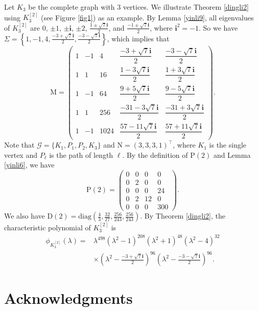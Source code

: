 \documentclass{article}
\begin{document}
Let $K_{3}$ be the complete graph with $3$ vertices.
We illustrate Theorem \ref{dingli2} using $K_{3}^{[2]}$ (see Figure \ref{fig1}) as an example.
By Lemma \ref{yinli9},
all eigenvalues of $K_{3}^{[2]}$ are $0$, $\pm 1$, $\pm \mathbf{i}$, $\pm 2$, $\frac{1\pm\sqrt{7}\mathbf{i}}{2}$, and $\frac{-1\pm\sqrt{7}\mathbf{i}}{2}$,
where $\mathbf{i}^{2}=-1$.
So we have $\Sigma=\left\{1, -1, 4, \frac{-3+\sqrt{7}\mathbf{i}}{2}, \frac{-3-\sqrt{7}\mathbf{i}}{2}\right\}$,
which implies that
\[
\mathrm{M} = \begin{pmatrix}
1 & -1 & 4 & \dfrac{-3+\sqrt{7}\mathbf{i}}{2} & \dfrac{-3-\sqrt{7}\mathbf{i}}{2} \\
1 & 1 & 16 & \dfrac{1-3\sqrt{7}\mathbf{i}}{2} & \dfrac{1+3\sqrt{7}\mathbf{i}}{2} \\
1 & -1 & 64 & \dfrac{9+5\sqrt{7}\mathbf{i}}{2} & \dfrac{9-5\sqrt{7}\mathbf{i}}{2} \\
1 & 1 & 256 & \dfrac{-31-3\sqrt{7}\mathbf{i}}{2} & \dfrac{-31+3\sqrt{7}\mathbf{i}}{2} \\
1 & -1 & 1024 & \dfrac{57-11\sqrt{7}\mathbf{i}}{2} & \dfrac{57+11\sqrt{7}\mathbf{i}}{2}
\end{pmatrix}.
\]
Note that $\mathcal{G}=\{K_{1},P_{1},P_{2},K_{3}\}$ and $\mathrm{N}=(3,3,3,1)^{\top}$,
where $K_{1}$ is the single vertex and $P_{\ell}$ is the path of length $\ell$.
By the definition of $\mathrm{P}(2)$ and Lemma \ref{yinli6},
we have $$\mathrm{P}(2)=\begin{pmatrix} 0 & 0 & 0 & 0 \\ 0 & 2 & 0 & 0 \\ 0 & 0 & 0 & 24 \\ 0 & 2 & 12 & 0 \\ 0 & 0 & 0 & 300 \end{pmatrix}.$$
We also have $\mathrm{D}(2)=\mathrm{diag}\left(\frac{4}{3},\frac{32}{27},\frac{256}{243},\frac{256}{243}\right)$.
By Theorem \ref{dingli2},
the characteristic polynomial of $K_{3}^{[2]}$ is
\begin{align*}
\phi_{K_{3}^{[2]}}(\lambda)=&\lambda^{498}\left(\lambda^{2}-1\right)^{208}\left(\lambda^{2}+1\right)^{48}\left(\lambda^{2}-4\right)^{32}\\
&\times\left(\lambda^{2}-\frac{-3+\sqrt{7}\mathbf{i}}{2}\right)^{96}\left(\lambda^{2}-\frac{-3-\sqrt{7}\mathbf{i}}{2}\right)^{96}.
\end{align*}





\section*{Acknowledgments}
\end{document}
